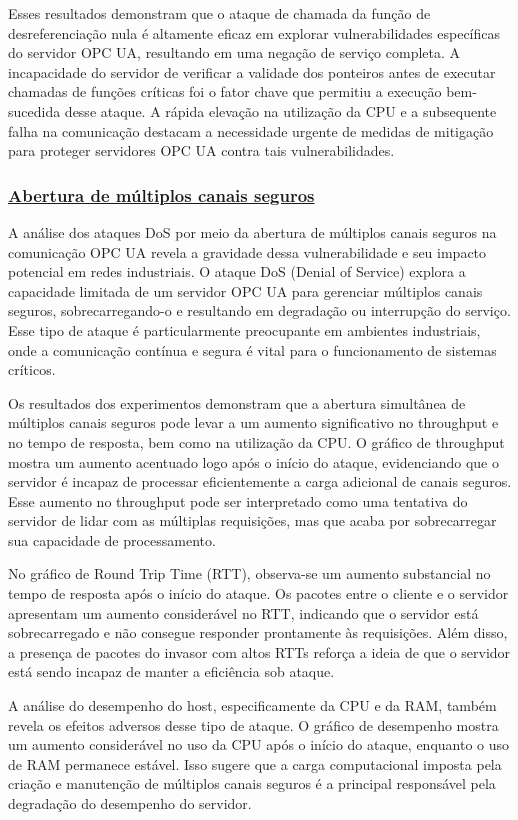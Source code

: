             Esses resultados demonstram que o ataque de chamada da função de desreferenciação nula é altamente eficaz em explorar vulnerabilidades específicas do servidor OPC UA, resultando em uma negação de serviço completa. A incapacidade do servidor de verificar a validade dos ponteiros antes de executar chamadas de funções críticas foi o fator chave que permitiu a execução bem-sucedida desse ataque. A rápida elevação na utilização da CPU e a subsequente falha na comunicação destacam a necessidade urgente de medidas de mitigação para proteger servidores OPC UA contra tais vulnerabilidades.

\subsubsection*{\underline{Abertura de múltiplos canais seguros}}

A análise dos ataques DoS por meio da abertura de múltiplos canais seguros na comunicação OPC UA revela a gravidade dessa vulnerabilidade e seu impacto potencial em redes industriais. O ataque DoS (Denial of Service) explora a capacidade limitada de um servidor OPC UA para gerenciar múltiplos canais seguros, sobrecarregando-o e resultando em degradação ou interrupção do serviço. Esse tipo de ataque é particularmente preocupante em ambientes industriais, onde a comunicação contínua e segura é vital para o funcionamento de sistemas críticos.

Os resultados dos experimentos demonstram que a abertura simultânea de múltiplos canais seguros pode levar a um aumento significativo no throughput e no tempo de resposta, bem como na utilização da CPU. O gráfico de throughput mostra um aumento acentuado logo após o início do ataque, evidenciando que o servidor é incapaz de processar eficientemente a carga adicional de canais seguros. Esse aumento no throughput pode ser interpretado como uma tentativa do servidor de lidar com as múltiplas requisições, mas que acaba por sobrecarregar sua capacidade de processamento.

No gráfico de Round Trip Time (RTT), observa-se um aumento substancial no tempo de resposta após o início do ataque. Os pacotes entre o cliente e o servidor apresentam um aumento considerável no RTT, indicando que o servidor está sobrecarregado e não consegue responder prontamente às requisições. Além disso, a presença de pacotes do invasor com altos RTTs reforça a ideia de que o servidor está sendo incapaz de manter a eficiência sob ataque.

A análise do desempenho do host, especificamente da CPU e da RAM, também revela os efeitos adversos desse tipo de ataque. O gráfico de desempenho mostra um aumento considerável no uso da CPU após o início do ataque, enquanto o uso de RAM permanece estável. Isso sugere que a carga computacional imposta pela criação e manutenção de múltiplos canais seguros é a principal responsável pela degradação do desempenho do servidor.

